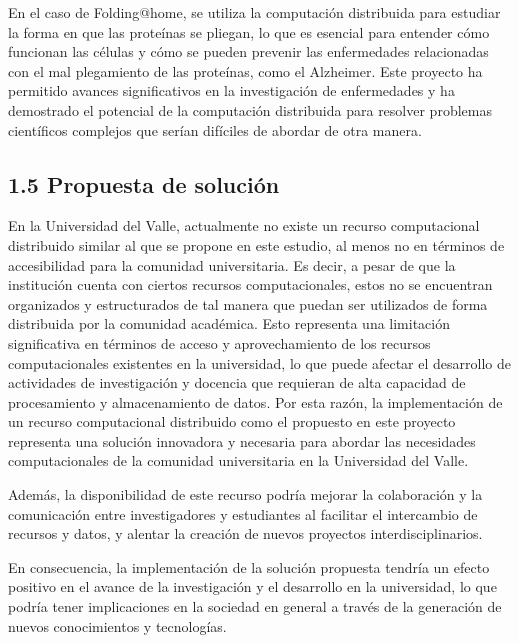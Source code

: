 \begin{spacing}{1.5}
  En el caso de Folding@home, se utiliza la computación distribuida para
  estudiar la forma en que las proteínas se pliegan, lo que es esencial para
  entender cómo funcionan las células y cómo se pueden prevenir las enfermedades
  relacionadas con el mal plegamiento de las proteínas, como el Alzheimer. Este
  proyecto ha permitido avances significativos en la investigación de
  enfermedades y ha demostrado el potencial de la computación distribuida para
  resolver problemas científicos complejos que serían difíciles de abordar de
  otra manera. \cite{Folding@home-1}

  \subsection{1.5 Propuesta de solución}

  En la Universidad del Valle, actualmente no existe un recurso computacional distribuido similar al que se propone en este estudio, al menos no en términos de accesibilidad para la comunidad universitaria. Es decir, a pesar de que la institución cuenta con ciertos recursos computacionales, estos no se encuentran organizados y estructurados de tal manera que puedan ser utilizados de forma distribuida por la comunidad académica. Esto representa una limitación significativa en términos de acceso y aprovechamiento de los recursos computacionales existentes en la universidad, lo que puede afectar el desarrollo de actividades de investigación y docencia que requieran de alta capacidad de procesamiento y almacenamiento de datos. Por esta razón, la implementación de un recurso computacional distribuido como el propuesto en este proyecto representa una solución innovadora y necesaria para abordar las necesidades computacionales de la comunidad universitaria en la Universidad del Valle.

  Además, la disponibilidad de este recurso podría mejorar la colaboración y la comunicación entre investigadores y estudiantes al facilitar el intercambio de recursos y datos, y alentar la creación de nuevos proyectos interdisciplinarios.

  En consecuencia, la implementación de la solución propuesta tendría un efecto positivo en el avance de la investigación y el desarrollo en la universidad, lo que podría tener implicaciones en la sociedad en general a través de la generación de nuevos conocimientos y tecnologías.


\end{spacing}
